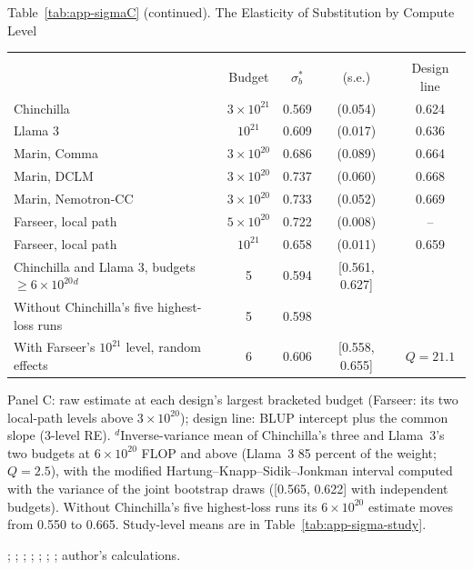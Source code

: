 \begin{table}[tp]
\centering
{\captionstyle\captionsize Table~\ref{tab:app-sigmaC} (continued). The Elasticity of Substitution by Compute Level\par}
\vspace{7pt}
\footnotesize
\setlength{\tabcolsep}{2pt}
\begin{tabular*}{\textwidth}{@{\extracolsep{\fill}}>{\raggedright\arraybackslash}p{}cccc@{}}
\toprule
\multicolumn{5}{@{}l}{\textit{Panel C. $\sigma^*$ at the largest budgets}} \\[1pt]
 & Budget & $\sigma^*_b$ & (s.e.) & Design line \\
\midrule
Chinchilla & $3\times10^{21}$ & 0.569 & (0.054) & 0.624 \\
Llama 3 & $10^{21}$ & 0.609 & (0.017) & 0.636 \\
Marin, Comma & $3\times10^{20}$ & 0.686 & (0.089) & 0.664 \\
Marin, DCLM & $3\times10^{20}$ & 0.737 & (0.060) & 0.668 \\
Marin, Nemotron-CC & $3\times10^{20}$ & 0.733 & (0.052) & 0.669 \\
Farseer, local path & $5\times10^{20}$ & 0.722 & (0.008) & -- \\
Farseer, local path & $10^{21}$ & 0.658 & (0.011) & 0.659 \\
Chinchilla and Llama 3, budgets $\ge6\times10^{20}$$^{d}$ & 5 & 0.594 & [0.561, 0.627] & \\
\quad Without Chinchilla's five highest-loss runs & 5 & 0.598 & & \\
\quad With Farseer's $10^{21}$ level, random effects & 6 & 0.606 & [0.558, 0.655] & $Q=21.1$ \\
\bottomrule
\end{tabular*}

\begin{tablenotes}
Panel C: raw estimate at each design's largest bracketed budget (Farseer: its two local-path levels above $3\times10^{20}$); design line: BLUP intercept plus the common slope (3-level RE). $^{d}$Inverse-variance mean of Chinchilla's three and Llama~3's two budgets at $6\times10^{20}$ FLOP and above (Llama~3 85 percent of the weight; $Q=2.5$), with the modified Hartung--Knapp--Sidik--Jonkman interval computed with the variance of the joint bootstrap draws ([0.565, 0.622] with independent budgets). Without Chinchilla's five highest-loss runs its $6\times10^{20}$ estimate moves from 0.550 to 0.665. Study-level means are in Table~\ref{tab:app-sigma-study}.
\end{tablenotes}

\begin{tablenotes}[Source]
\citet{hoffmann2022training}; \citet{besiroglu2024chinchilla}; \citet{grattafiori2024llama}; \citet{czech2026llama3isoflop}; \citet{marin2026ladders}; \citet{porian2024resolving}; \citet{li2025predictableb}; author's calculations.
\end{tablenotes}
\end{table}

